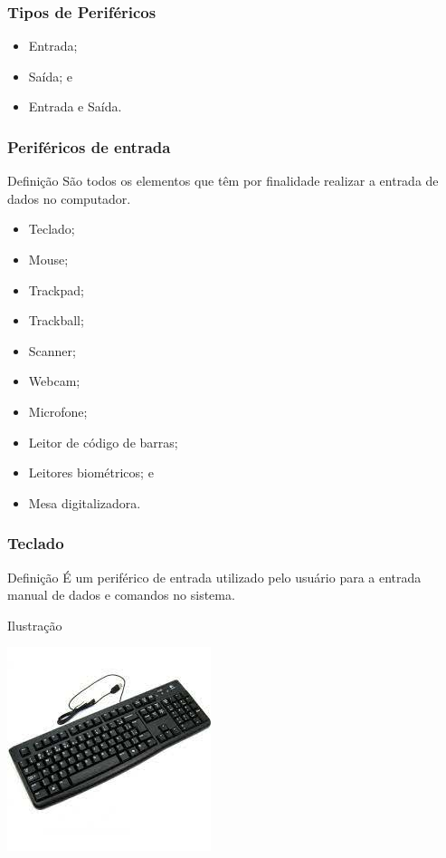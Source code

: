 \documentclass[aspectratio=169]{beamer} %
\begin{document}
\begin{frame}
	\frametitle{Tipos de Periféricos}
		
	\begin{itemize}
		\item Entrada;
		\item Saída; e
		\item Entrada e Saída.
	\end{itemize}
\end{frame}

\begin{frame}
	\frametitle{Periféricos de entrada}
	
	\begin{block}{Defini\c cão}
		São todos os elementos que têm por finalidade realizar a entrada de dados no computador.
	\end{block}\vfill
	
	\begin{itemize}
		\item Teclado;
		\item Mouse;
		\item Trackpad;
		\item Trackball;
		\item Scanner;
		\item Webcam;
		\item Microfone;
		\item Leitor de código de barras;
		\item Leitores biométricos; e
		\item Mesa digitalizadora.
	\end{itemize}
\end{frame}

\begin{frame}
	\frametitle{Teclado}
	
	\begin{block}{Defini\c cão}
		É um periférico de entrada utilizado pelo usuário para a entrada manual de dados e comandos no sistema.
	\end{block}\vfill
	
	\begin{exampleblock}{Ilustra\c cão}
		\begin{center}
			\includegraphics[scale=0.4]{img/teclado}
		\end{center}
	\end{exampleblock}
\end{frame}
\end{document}
